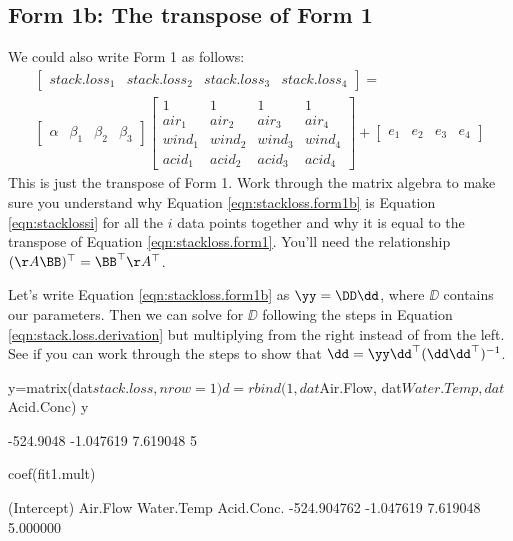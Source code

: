 \subsection{Form 1b: The transpose of Form 1}\label{solveform1b}
We could also write Form 1 as follows:
\begin{equation}\label{eqn:stackloss.form1b} 
\begin{split}
\begin{bmatrix}stack.loss_1&stack.loss_2&stack.loss_3 &stack.loss_4\end{bmatrix}
= \\
\begin{bmatrix}\alpha& \beta_1 & \beta_2 & \beta_3 \end{bmatrix}
\begin{bmatrix}1&1&1&1\\air_1&air_2&air_3&air_4\\wind_1&wind_2&wind_3&wind_4\\acid_1&acid_2&acid_3&acid_4\end{bmatrix}
+
\begin{bmatrix}e_1&e_2&e_3&e_4\end{bmatrix}
\end{split}
\end{equation}
This is just the transpose of Form 1.  Work through the matrix algebra to make sure you understand why Equation \ref{eqn:stackloss.form1b} is Equation \ref{eqn:stacklossi} for all the $i$ data points together and why it is equal to the transpose of Equation \ref{eqn:stackloss.form1}.  You'll need the relationship $(\AA\BB)^\top=\BB^\top \AA^\top$.

Let's write Equation \ref{eqn:stackloss.form1b} as $\yy = \DD\dd$, where $\DD$ contains our parameters.  Then we can solve for $\DD$ following the steps in Equation \ref{eqn:stack.loss.derivation} but multiplying from the right instead of from the left.  See if you can work through the steps to show that 
$\dd = \yy\dd^\top(\dd\dd^\top)^{-1}$.

\begin{Schunk}
\begin{Sinput}
 y=matrix(dat$stack.loss, nrow=1)
 d=rbind(1, dat$Air.Flow, dat$Water.Temp, dat$Acid.Conc)
 y%*%t(d)%*%solve(d%*%t(d))
\end{Sinput}
\begin{Soutput}
          [,1]      [,2]     [,3] [,4]
[1,] -524.9048 -1.047619 7.619048    5
\end{Soutput}
\begin{Sinput}
 coef(fit1.mult)
\end{Sinput}
\begin{Soutput}
(Intercept)    Air.Flow  Water.Temp  Acid.Conc. 
-524.904762   -1.047619    7.619048    5.000000 
\end{Soutput}
\end{Schunk}

